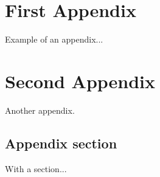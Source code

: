 \begin{appendices}

\chapter{First Appendix}
\label{app3}

Example of an appendix...

\chapter{Second Appendix}
\label{app2}

Another appendix.

\section{Appendix section}

With a section...


\end{appendices}
